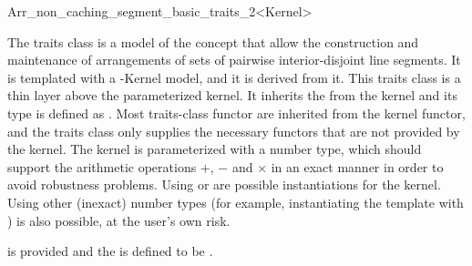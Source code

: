 
\ccRefPageBegin

\begin{ccRefClass}{Arr_non_caching_segment_basic_traits_2<Kernel>}
    
\ccDefinition 

The traits class \ccRefName{} is a model of the 
concept that allow the construction and maintenance of arrangements of
sets of pairwise interior-disjoint line segments. It is templated with a
\cgal-Kernel model, and it is derived from it. This traits class is a
thin layer above the parameterized kernel. It inherits the 
from the kernel and its  type is defined as
. Most traits-class functor are inherited from the
kernel functor, and the traits class only supplies the necessary functors
that are not provided by the kernel. The kernel is parameterized with a
number type, which should support the arithmetic operations $+$, $-$ and
$\times$ in an exact manner in order to avoid robustness problems.
Using  or  are possible
instantiations for the kernel. Using other (inexact) number types
(for example, instantiating the template with
) is also possible, at the user's own
risk.

 is provided and the 
is defined to be .
    
 
\ccIsModel

\end{ccRefClass}
\ccRefPageEnd
